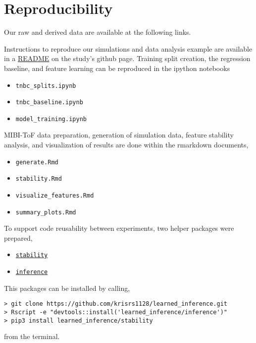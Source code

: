 
\section{Reproducibility}

Our raw and derived data are available at the following links.

Instructions to reproduce our simulations and data analysis example are
available in a \href{https://github.com/krisrs1128/learned_inference}{README} on
the study's github page. Training split creation, the regression baseline, and
feature learning can be reproduced in the ipython notebooks

\begin{itemize}
\item \texttt{tnbc\_splits.ipynb}
\item \texttt{tnbc\_baseline.ipynb}
\item \texttt{model\_training.ipynb}
\end{itemize}

MIBI-ToF data preparation, generation of simulation data, feature stability
analysis, and visualization of results are done within the rmarkdown documents,

\begin{itemize}
\item \texttt{generate.Rmd}
\item \texttt{stability.Rmd}
\item \texttt{visualize\_features.Rmd}
\item \texttt{summary\_plots.Rmd}
\end{itemize}

To support code reusability between experiments, two helper packages were prepared,

\begin{itemize}
\item \href{https://github.com/krisrs1128/learned_inference/tree/master/stability}{\texttt{stability}}
\item \href{https://github.com/krisrs1128/learned_inference/tree/master/inference}{\texttt{inference}}
\end{itemize}

This packages can be installed by calling,

\begin{verbatim}
> git clone https://github.com/krisrs1128/learned_inference.git
> Rscript -e "devtools::install('learned_inference/inference')"
> pip3 install learned_inference/stability
\end{verbatim}
from the terminal.

